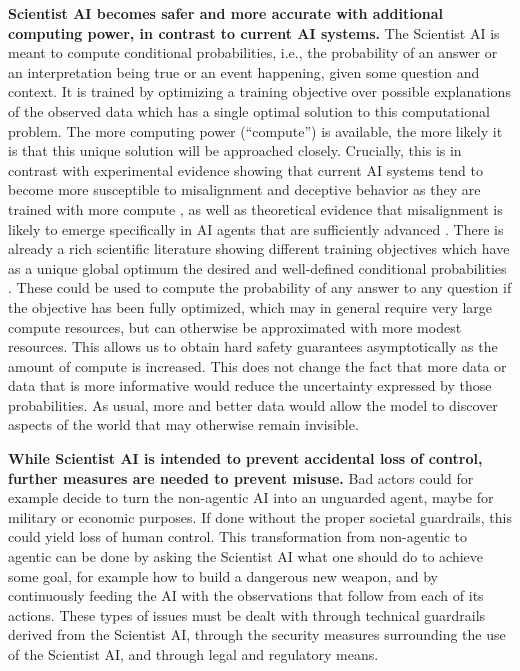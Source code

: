 \textbf{Scientist AI becomes safer and more accurate with additional computing power, in contrast to current AI systems.} The Scientist AI is meant to compute conditional probabilities, i.e., the probability of an answer or an interpretation being true or an event happening, given some question and context. It is trained by optimizing a training objective over possible explanations of the observed data which has a single optimal solution to this computational problem. The more computing power (``compute'') is available, the more likely it is that this unique solution will be approached closely. Crucially, this is in contrast with experimental evidence showing that current AI systems tend to become more susceptible to misalignment and deceptive behavior as they are trained with more compute \cite{arxiv.org.abs.2412.14093}, as well as theoretical evidence that misalignment is likely to emerge specifically in AI agents that are sufficiently advanced \cite{ojs.aaai.org.aimagazine.index.php.aimagazine.article.view.15084}. There is already a rich scientific literature showing different training objectives which have as a unique global optimum the desired and well-defined conditional probabilities \cite{openreview.net.forum.id.uKiE0VIluA,proceedings.mlr.press.v202.hu23c.html,openreview.net.forum.id.vieIamY2Gi,ml4physicalsciences.github.io.2024.files.NeurIPS.ML4PS.2024.188.pdf,richardson.one-true-loss}. These could be used to compute the probability of any answer to any question if the objective has been fully optimized, which may in general require very large compute resources, but can otherwise be approximated with more modest resources. This allows us to obtain hard safety guarantees asymptotically as the amount of compute is increased. This does not change the fact that more data or data that is more informative would reduce the uncertainty expressed by those probabilities. As usual, more and better data would allow the model to discover aspects of the world that may otherwise remain invisible.

\textbf{While Scientist AI is intended to prevent accidental loss of control, further measures are needed to prevent misuse.} Bad actors could for example decide to turn the non-agentic AI into an unguarded agent, maybe for military or economic purposes. If done without the proper societal guardrails, this could yield loss of human control. This transformation from non-agentic to agentic can be done by asking the Scientist AI what one should do to achieve some goal, for example how to build a dangerous new weapon, and by continuously feeding the AI with the observations that follow from each of its actions. These types of issues must be dealt with through technical guardrails derived from the Scientist AI, through the security measures surrounding the use of the Scientist AI, and through legal and regulatory means.

